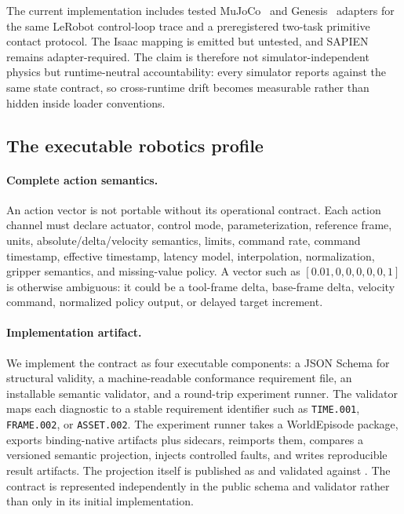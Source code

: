 The current implementation includes tested MuJoCo~\citep{mujoco} and
Genesis~\citep{genesis} adapters for the same LeRobot control-loop trace and a preregistered
two-task primitive contact protocol. The Isaac
mapping is emitted but untested, and SAPIEN remains adapter-required. The claim is therefore not
simulator-independent physics but runtime-neutral accountability: every simulator reports against
the same state contract, so cross-runtime drift becomes measurable rather than hidden inside loader
conventions.

\subsection{The executable robotics profile}
\label{sec:profile}

\paragraph{Complete action semantics.}
An action vector is not portable without its operational contract. Each action channel must declare
actuator, control mode, parameterization, reference frame, units, absolute/delta/velocity semantics,
limits, command rate, command timestamp, effective timestamp, latency model, interpolation,
normalization, gripper semantics, and missing-value policy. A vector such as
\([0.01,0,0,0,0,0,1]\) is otherwise ambiguous: it could be a tool-frame delta, base-frame delta,
velocity command, normalized policy output, or delayed target increment.

\paragraph{Implementation artifact.}
We implement the contract as four executable components: a JSON Schema for structural validity, a
machine-readable conformance requirement file, an installable semantic validator, and a round-trip
experiment runner. The validator maps each diagnostic to a stable requirement identifier such as
\texttt{TIME.001}, \texttt{FRAME.002}, or \texttt{ASSET.002}. The experiment runner takes a
WorldEpisode package, exports binding-native artifacts plus sidecars, reimports them, compares a
versioned semantic projection, injects controlled faults, and writes reproducible result artifacts.
The projection itself is published as  and
validated against . The contract is represented
independently in the public schema and validator rather than only in its initial implementation.


